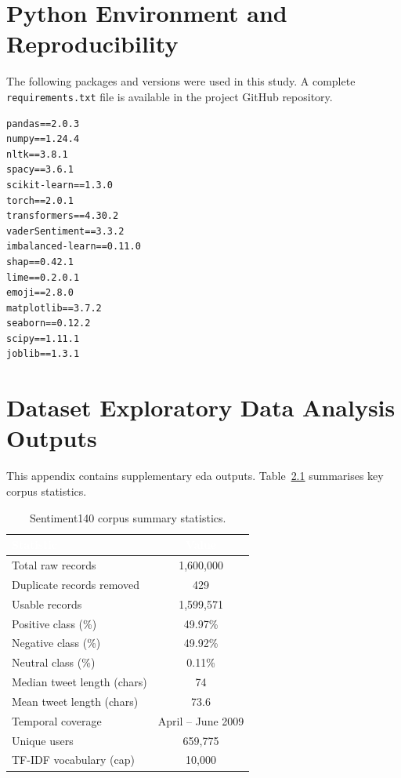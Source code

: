 \chapter{Python Environment and Reproducibility}
\label{app:env}

The following packages and versions were used in this study. A complete \texttt{requirements.txt} file is available in the project GitHub repository.

\begin{lstlisting}[language={},caption={Core Python dependencies (requirements.txt).},label={lst:requirements}]
pandas==2.0.3
numpy==1.24.4
nltk==3.8.1
spacy==3.6.1
scikit-learn==1.3.0
torch==2.0.1
transformers==4.30.2
vaderSentiment==3.3.2
imbalanced-learn==0.11.0
shap==0.42.1
lime==0.2.0.1
emoji==2.8.0
matplotlib==3.7.2
seaborn==0.12.2
scipy==1.11.1
joblib==1.3.1
\end{lstlisting}

\chapter{Dataset Exploratory Data Analysis Outputs}
\label{app:eda}

This appendix contains supplementary \gls{eda} outputs. Table~\ref{tab:eda_summary} summarises key corpus statistics.

\begin{table}[H]
\centering
\caption{Sentiment140 corpus summary statistics.}
\label{tab:eda_summary}
\begin{tabular}{lc}
  \toprule
  \rowcolor{uwsblue!90}
  \textcolor{white}{\textbf{Statistic}} & \textcolor{white}{\textbf{Value}} \\
  \midrule
  \rowcolor{tablegrey}
  Total raw records            & 1,600,000 \\
  Duplicate records removed    & 429 \\
  \rowcolor{tablegrey}
  Usable records               & 1,599,571 \\
  Positive class (\%)          & 49.97\% \\
  \rowcolor{tablegrey}
  Negative class (\%)          & 49.92\% \\
  Neutral class (\%)           & 0.11\% \\
  \rowcolor{tablegrey}
  Median tweet length (chars)  & 74 \\
  Mean tweet length (chars)    & 73.6 \\
  \rowcolor{tablegrey}
  Temporal coverage            & April -- June 2009 \\
  Unique users                 & 659,775 \\
  \rowcolor{tablegrey}
  TF-IDF vocabulary (cap)      & 10,000 \\
  \bottomrule
\end{tabular}
\end{table}

